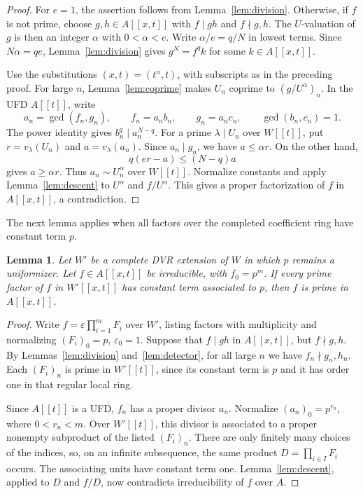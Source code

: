\documentclass[11pt]{amsart}
\newtheorem{lemma}[theorem]{Lemma}
\theoremstyle{remark}
\begin{document}
\begin{proof}
For $e=1$, the assertion follows from Lemma~\ref{lem:division}.
Otherwise, if $f$ is not prime, choose $g,h\in A[[x,t]]$ with
$f\mid gh$ and $f\nmid g,h$. The $U$-valuation of $g$ is then
an integer $\alpha$ with $0<\alpha<e$. Write $\alpha/e=q/N$
in lowest terms. Since $N\alpha=qe$, Lemma~\ref{lem:division}
gives $g^N=f^qk$ for some $k\in A[[x,t]]$.

Use the substitutions $(x,t)=(t^n,t)$, with subscripts as in the
preceding proof. For large $n$, Lemma~\ref{lem:coprime} makes
$U_n$ coprime to $(g/U^\alpha)_n$. In the UFD $A[[t]]$, write
\[
 a_n=\gcd(f_n,g_n),\qquad f_n=a_nb_n,\qquad g_n=a_nc_n,
 \qquad\gcd(b_n,c_n)=1.
\]
The power identity gives $b_n^q\mid a_n^{N-q}$. For a prime
$\lambda\mid U_n$ over $W[[t]]$, put $r=v_\lambda(U_n)$
and $a=v_\lambda(a_n)$. Since $a_n\mid g_n$, we have
$a\leq\alpha r$. On the other hand,
\[
 q(er-a)\leq(N-q)a
\]
gives $a\geq\alpha r$. Thus $a_n\sim U_n^\alpha$ over
$W[[t]]$. Normalize constants and apply Lemma~\ref{lem:descent}
to $U^\alpha$ and $f/U^\alpha$. This gives a proper factorization
of $f$ in $A[[x,t]]$, a contradiction.
\end{proof}

The next lemma applies when all factors over the completed
coefficient ring have constant term $p$.

\begin{lemma}\label{cor:split}
Let $W'$ be a complete DVR extension of $W$ in which $p$ remains
a uniformizer. Let $f\in A[[x,t]]$ be irreducible, with $f_0=p^m$.
If every prime factor of $f$ in $W'[[x,t]]$ has constant term
associated to $p$, then $f$ is prime in $A[[x,t]]$.
\end{lemma}

\begin{proof}
Write $f=\varepsilon\prod_{i=1}^m F_i$ over $W'$, listing factors
with multiplicity and normalizing $(F_i)_0=p$, $\varepsilon_0=1$.
Suppose that $f\mid gh$ in $A[[x,t]]$, but $f\nmid g,h$.
By Lemmas~\ref{lem:division} and~\ref{lem:detector}, for all
large $n$ we have $f_n\nmid g_n,h_n$. Each $(F_i)_n$ is prime
in $W'[[t]]$, since its constant term is $p$ and it has order
one in that regular local ring.

Since $A[[t]]$ is a UFD, $f_n$ has a proper divisor $a_n$.
Normalize $(a_n)_0=p^{r_n}$, where $0<r_n<m$. Over $W'[[t]]$,
this divisor is associated to a proper nonempty subproduct of the
listed $(F_i)_n$. There are only finitely many choices of the
indices, so, on an infinite subsequence, the same product
$D=\prod_{i\in I}F_i$ occurs. The associating units have constant
term one. Lemma~\ref{lem:descent}, applied to $D$ and $f/D$,
now contradicts irreducibility of $f$ over $A$.
\end{proof}
\end{document}
